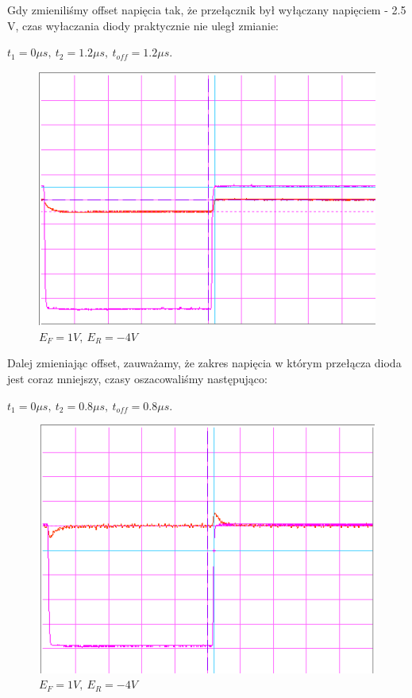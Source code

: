 \documentclass[a4paper,11pt]{article}
\begin{document}
Gdy zmieniliśmy offset napięcia tak, że przełącznik był wyłączany napięciem - 2.5 V, czas wyłaczania diody praktycznie nie uległ zmianie:

\(t_1 = 0 \mu s,\ t_2 = 1.2 \mu s,\ t_{off} = 1.2 \mu s \).

\begin{figure} [H]
  \begin{center}
    \includegraphics{../Obrazki_i_tekst/obrobione/31csciety.png}
    \caption{\( E_F = 1V, \ E_R = -4 V\)}
  \end{center}
\end{figure}

Dalej zmieniając offset, zauważamy, że zakres napięcia w którym przełącza dioda jest coraz mniejszy, czasy oszacowaliśmy następująco:

 \(t_1 = 0 \mu s,\ t_2 = 0.8 \mu s,\ t_{off} = 0.8 \mu s \).

\begin{figure} [H]
  \begin{center}
    \includegraphics{../Obrazki_i_tekst/obrobione/31dsciety.png}
    \caption{\( E_F = 1V, \ E_R = -4 V\)}
  \end{center}
\end{figure}
\end{document}
